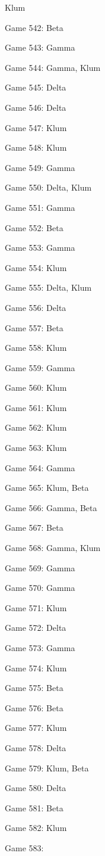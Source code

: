 \documentclass{article}
\begin{document}
\begin{multicols}{3}
\begin{compactitem}
Klum
\item Game 542:
Beta
\item Game 543:
Gamma
\item Game 544:
Gamma, Klum
\item Game 545:
Delta
\item Game 546:
Delta
\item Game 547:
Klum
\item Game 548:
Klum
\item Game 549:
Gamma
\item Game 550:
Delta, Klum
\item Game 551:
Gamma
\item Game 552:
Beta
\item Game 553:
Gamma
\item Game 554:
Klum
\item Game 555:
Delta, Klum
\item Game 556:
Delta
\item Game 557:
Beta
\item Game 558:
Klum
\item Game 559:
Gamma
\item Game 560:
Klum
\item Game 561:
Klum
\item Game 562:
Klum
\item Game 563:
Klum
\item Game 564:
Gamma
\item Game 565:
Klum, Beta
\item Game 566:
Gamma, Beta
\item Game 567:
Beta
\item Game 568:
Gamma, Klum
\item Game 569:
Gamma
\item Game 570:
Gamma
\item Game 571:
Klum
\item Game 572:
Delta
\item Game 573:
Gamma
\item Game 574:
Klum
\item Game 575:
Beta
\item Game 576:
Beta
\item Game 577:
Klum
\item Game 578:
Delta
\item Game 579:
Klum, Beta
\item Game 580:
Delta
\item Game 581:
Beta
\item Game 582:
Klum
\item Game 583:

\end{compactitem}
\end{multicols}
\end{document}
